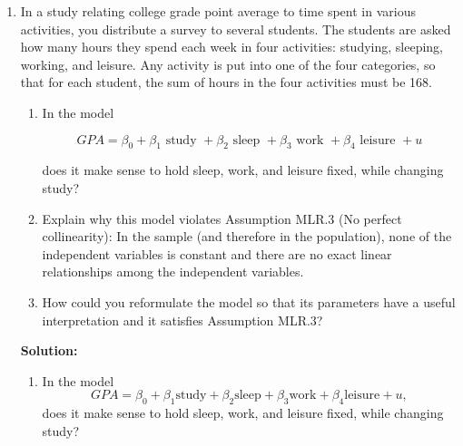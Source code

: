 \documentclass[12pt]{article}
\begin{document}
\begin{enumerate}
{\begin{enumerate}
    \item Would you say it is better to attend a higher-ranked law school? How much is a difference in ranking of 20 worth in terms of predicted starting salary?

    The coefficient on "rank" is \( -0.0033 \), indicating that a one-unit increase in rank (worse ranking) is associated with a \( 0.33\% \) decrease in starting salary. For a difference in ranking of 20 positions, the predicted decrease in salary is:

    \[
    20 \times (-0.0033) \times 100 = -6.6\%.
    \]

    Therefore, a difference of 20 positions in ranking is associated with a \( 6.6\% \) decrease in predicted starting salary. This suggests that attending a higher-ranked law school has a significant positive effect on expected starting salary.
\end{enumerate}

}

\item In a study relating college grade point average to time spent in various activities, you distribute a survey to several students. The students are asked how many hours they spend each week in four activities: studying, sleeping, working, and leisure. Any activity is put into one of the four categories, so that for each student, the sum of hours in the four activities must be 168.
\begin{enumerate}
    \item In the model

$$
G P A=\beta_0+\beta_1 \text { study }+\beta_2 \text { sleep }+\beta_3 \text { work }+\beta_4 \text { leisure }+u
$$

does it make sense to hold sleep, work, and leisure fixed, while changing study?
\item Explain why this model violates Assumption MLR.3 (No perfect collinearity): In the sample (and therefore in the
population), none of the independent variables is constant and there are no exact
linear relationships among the independent variables.
\item How could you reformulate the model so that its parameters have a useful interpretation and it satisfies Assumption MLR.3?

\end{enumerate}

{\color{blue}
\noindent \textbf{Solution:}
\begin{enumerate}
    \item In the model
    \[
    GPA = \beta_0 + \beta_1 \text{study} + \beta_2 \text{sleep} + \beta_3 \text{work} + \beta_4 \text{leisure} + u,
    \]
    does it make sense to hold sleep, work, and leisure fixed, while changing study?


\end{enumerate}}
\end{enumerate}
\end{document}

